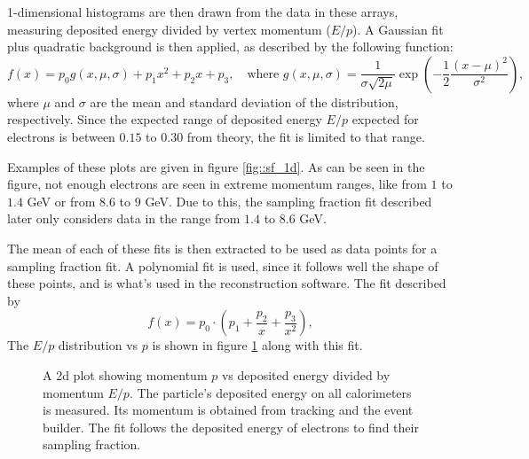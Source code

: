     1-dimensional histograms are then drawn from the data in these arrays, measuring deposited energy divided by vertex momentum ($E/p$).
    A Gaussian fit plus quadratic background is then applied, as described by the following function:
    \begin{equation*}
        f(x) = p_0 g(x, \mu, \sigma) + p_1 x^2 + p_2 x + p_3, \hspace{12pt}
        \text{where} \hspace{4pt}
        g(x, \mu, \sigma) = \frac{1}{\sigma \sqrt{2\mu}} \exp \left(-\frac{1}{2} \frac{(x - \mu)^2}{\sigma^2}\right),
    \end{equation*}
    where $\mu$ and $\sigma$ are the mean and standard deviation of the distribution, respectively.
    Since the expected range of deposited energy $E/p$ expected for electrons is between $0.15$ to $0.30$ from theory, the fit is limited to that range.
    
    Examples of these plots are given in figure \ref{fig::sf_1d}.
    As can be seen in the figure, not enough electrons are seen in extreme momentum ranges, like from $1$ to $1.4$ GeV or from $8.6$ to $9$ GeV.
    Due to this, the sampling fraction fit described later only considers data in the range from $1.4$ to $8.6$ GeV.
    
    The mean of each of these fits is then extracted to be used as data points for a sampling fraction fit.
    A polynomial fit is used, since it follows well the shape of these points, and is what's used in the reconstruction software.
    The fit described by
    \begin{equation*}
        f(x) = p_0 \cdot \left(p_1 + \frac{p_2}{x} + \frac{p_3}{x^2}\right),
    \end{equation*}
    The $E/p$ distribution vs $p$ is shown in figure \ref{fig::sf_2d} along with this fit.
    
    \begin{figure}[t!]
        \centering{}
        \caption[Calorimeters $p vs E/p$ plots]{A 2d plot showing momentum $p$ vs deposited energy divided by momentum $E/p$. The particle's deposited energy on all calorimeters is measured. Its momentum is obtained from tracking and the event builder. The fit follows the deposited energy of electrons to find their sampling fraction.}
        \label{fig::sf_2d}
    \end{figure}

